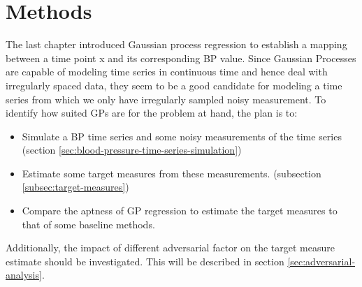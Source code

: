 \usepackage{mathtools}\chapter{Methods}\label{ch:methods}

The last chapter introduced Gaussian process regression
to establish a mapping between a time point x and its
corresponding BP value.
Since Gaussian Processes are capable of modeling time series in continuous
time and hence deal with irregularly spaced data,
they seem to be a good candidate for modeling a time series from which
we only have irregularly sampled noisy measurement.
To identify how suited GPs are for the problem at hand, the plan is to:
\begin{itemize}
    \item Simulate a BP time series and some noisy measurements of the time series
    (section \ref{sec:blood-pressure-time-series-simulation})
    \item Estimate some target measures from these measurements.
    (subsection \ref{subsec:target-measures})
    \item Compare the aptness of GP regression to estimate the target measures
    to that of some baseline methods.

\end{itemize}

Additionally, the impact of different adversarial factor on the target measure estimate
should be investigated.
This will be described in section \ref{sec:adversarial-analysis}.




%
%

